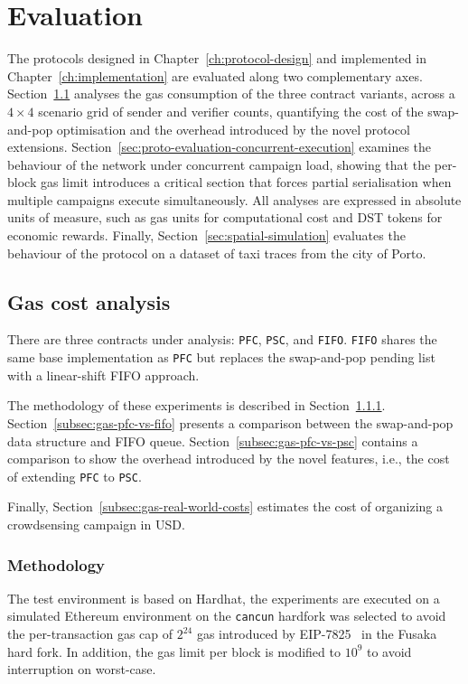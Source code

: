 \chapter{Evaluation}\label{ch:evaluation}

The protocols designed in Chapter~\ref{ch:protocol-design} and implemented in
Chapter~\ref{ch:implementation} are evaluated along two complementary axes.
Section~\ref{sec:gas-analysis} analyses the gas consumption of the three
contract variants, across a $4 \times 4$ scenario grid of sender and verifier counts, quantifying the cost
of the swap-and-pop optimisation and the overhead introduced by the novel
protocol extensions.
Section~\ref{sec:proto-evaluation-concurrent-execution} examines the behaviour
of the network under concurrent campaign load, showing that the per-block gas
limit introduces a critical section that forces partial serialisation when
multiple campaigns execute simultaneously.
All analyses are expressed in absolute units of measure, such as gas units for
computational cost and DST tokens for economic rewards.
Finally, Section~\ref{sec:spatial-simulation} evaluates the behaviour of the protocol on a dataset of taxi traces from the city of Porto.


\section{Gas cost analysis}\label{sec:gas-analysis}
There are three contracts under analysis: \texttt{PFC}, \texttt{PSC}, and \texttt{FIFO}.
\texttt{FIFO} shares the same base implementation as \texttt{PFC} but replaces the swap-and-pop pending list with a linear-shift FIFO approach.

The methodology of these experiments is described in Section~\ref{subsec:gas-analysis-methodology}.
Section~\ref{subsec:gas-pfc-vs-fifo} presents a comparison between the swap-and-pop data structure and FIFO queue.
Section~\ref{subsec:gas-pfc-vs-psc} contains a comparison to show the overhead introduced by the novel features, i.e., the cost of extending \texttt{PFC} to \texttt{PSC}.

Finally, Section~\ref{subsec:gas-real-world-costs} estimates the cost of organizing a crowdsensing campaign in USD.

\subsection{Methodology}\label{subsec:gas-analysis-methodology}
The test environment is based on Hardhat, the experiments are executed on a simulated Ethereum environment on the \texttt{cancun} hardfork was selected to avoid the per-transaction gas cap of $2^{24}$ gas introduced by EIP-7825~\cite{eip7825} in the Fusaka hard fork.
In addition, the gas limit per block is modified to $10^9$ to avoid interruption on worst-case.

